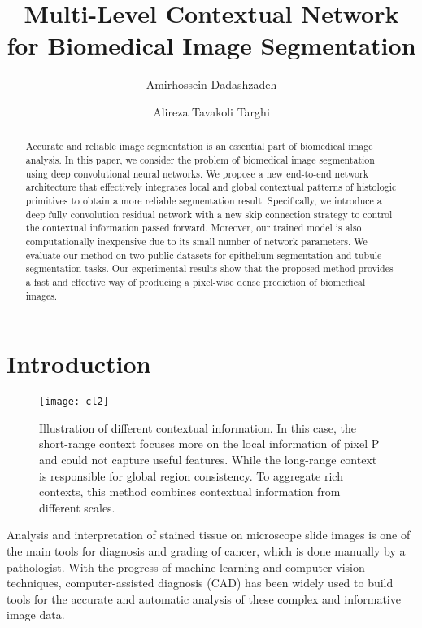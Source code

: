 \documentclass[10pt,twocolumn]{article}
\begin{document}
\title{Multi-Level Contextual Network for Biomedical Image Segmentation}

\author{ Amirhossein Dadashzadeh }
\author{ Alireza Tavakoli Targhi}


\maketitle
\thispagestyle{empty}

\begin{abstract}
Accurate and reliable image segmentation is an essential part of biomedical image analysis. In this paper, we consider the problem of biomedical image segmentation
using deep convolutional neural networks. We propose a new end-to-end network architecture that effectively integrates local and global contextual patterns of histologic primitives to obtain a more reliable segmentation result. Specifically, we introduce a deep fully convolution residual network with a new skip connection strategy to control the contextual information passed forward.
 Moreover, our trained model is also computationally inexpensive due to its small number of network parameters.
We evaluate our method on two public datasets for epithelium segmentation and tubule segmentation tasks.
Our experimental results show that the proposed method provides a fast and effective way of producing a pixel-wise dense prediction of biomedical images. 
\end{abstract}


\section{Introduction} \label{intro}
\begin{figure}[t]

\centering
\texttt{[image: cl2]}
\caption{Illustration of different contextual information. In this case, the short-range context focuses more on the local information of pixel P and could not capture useful features. While the long-range context is responsible for global region consistency. To aggregate rich contexts, this method combines contextual information from different scales. 
}
\label{f1}
\end{figure}
Analysis and interpretation of stained tissue on microscope slide images is one of the main tools for diagnosis and grading of cancer, which is done manually by a pathologist.
With the progress of machine learning and computer vision techniques, computer-assisted diagnosis (CAD) has been widely used to build tools for the accurate and automatic analysis of these complex and informative image data.
\end{document}
